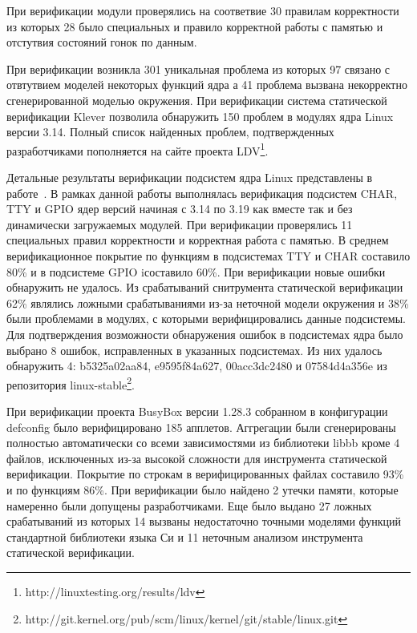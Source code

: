 \documentclass[%
candidate,     %
href,        %
colorlinks,  %
]{disser}
\begin{document}
При верификации модули проверялись на соответвие 30 правилам корректности из которых 28 было специальных и правило корректной работы с памятью и отстутвия состояний гонок по данным.

При верификации возникла 301 уникальная проблема из которых 97 связано с отвтутвием моделей некоторых функций ядра а 41 проблема вызвана некорректно сгенерированной моделью окружения.
При верификации система статической верификации Klever позволила обнаружить 150 проблем в модулях ядра Linux версии 3.14.
Полный список найденных проблем, подтвержденных разработчиками пополняется на сайте проекта LDV\footnote{http://linuxtesting.org/results/ldv}.

Детальные результаты верификации подсистем ядра Linux представлены в работе~\cite{Novikov:2018:ISOLA}.
В рамках данной работы выполнялась верификация подсистем CHAR, TTY и GPIO ядер версий начиная с 3.14 по 3.19 как вместе так и без динамически загружаемых модулей.
При верификации проверялись 11 специальных правил корректности и корректная работа с памятью.
В среднем верификационное покрытие по функциям в подсистемах TTY и CHAR составило 80\% и в подсистеме GPIO iсоставило 60\%. 
При верификации новые ошибки обнаружить не удалось.
Из срабатываний снитрумента статической верификации 62\% являлись ложными срабатываниями из-за неточной модели окружения и 38\% были проблемами в модулях, с которыми верифицировались данные подсистемы.
Для подтверждения возможности обнаружения ошибок в подсистемах ядра было выбрано 8 ошибок, исправленных в указанных подсистемах. 
Из них удалось обнаружить 4: b5325a02aa84, e9595f84a627, 00acc3dc2480 и
07584d4a356e из репозитория linux-stable\footnote{http://git.kernel.org/pub/scm/linux/kernel/git/stable/linux.git}.

При верификации проекта BusyBox версии 1.28.3 собранном в конфигурации defconfig было верифицировано 185 апплетов.
Аггрегации были сгенерированы полностью автоматически со всеми зависимостями из библиотеки libbb кроме 4 файлов, исключенных из-за высокой сложности для инструмента статической верификации.
Покрытие по строкам в верифицированных файлах составило  93\% и по функциям 86\%.
При верификации было найдено 2 утечки памяти, которые намеренно были допущены разработчиками.
Еще было выдано 27 ложных срабатываний из которых 14 вызваны недостаточно точными моделями функций стандартной библиотеки языка Си и 11 неточным анализом инструмента статической верификации.
\end{document}
